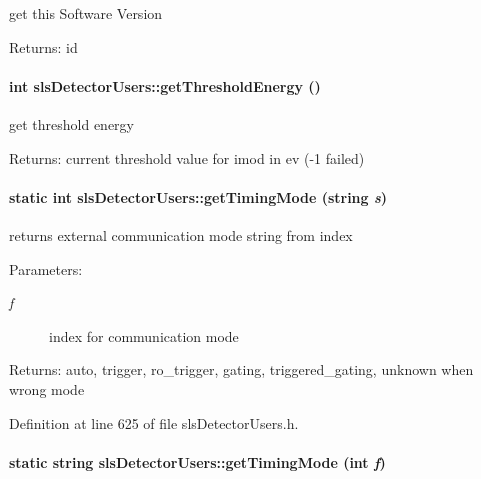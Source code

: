 get this Software Version \begin{Desc}
\item[Returns:]id \end{Desc}
\hypertarget{classslsDetectorUsers_fe8029788742125c44383817f89214ca}{
\paragraph[getThresholdEnergy]{\setlength{\rightskip}{0pt plus 5cm}int sls\-Detector\-Users::get\-Threshold\-Energy ()}\hfill}
\label{classslsDetectorUsers_fe8029788742125c44383817f89214ca}


get threshold energy 

\begin{Desc}
\item[Returns:]current threshold value for imod in ev (-1 failed) \end{Desc}
\hypertarget{classslsDetectorUsers_e88a9626e4e661c1c0e1d27ba4a57d50}{
\paragraph[getTimingMode]{\setlength{\rightskip}{0pt plus 5cm}static int sls\-Detector\-Users::get\-Timing\-Mode (string {\em s})}\hfill}
\label{classslsDetectorUsers_e88a9626e4e661c1c0e1d27ba4a57d50}


returns external communication mode string from index 

\begin{Desc}
\item[Parameters:]
\begin{description}
\item[{\em f}]index for communication mode \end{description}
\end{Desc}
\begin{Desc}
\item[Returns:]auto, trigger, ro\_\-trigger, gating, triggered\_\-gating, unknown when wrong mode \end{Desc}


Definition at line 625 of file sls\-Detector\-Users.h.\hypertarget{classslsDetectorUsers_420880726f4036bf9da83edfcb2d6cf0}{
\paragraph[getTimingMode]{\setlength{\rightskip}{0pt plus 5cm}static string sls\-Detector\-Users::get\-Timing\-Mode (int {\em f})}\hfill}
\label{classslsDetectorUsers_420880726f4036bf9da83edfcb2d6cf0}


